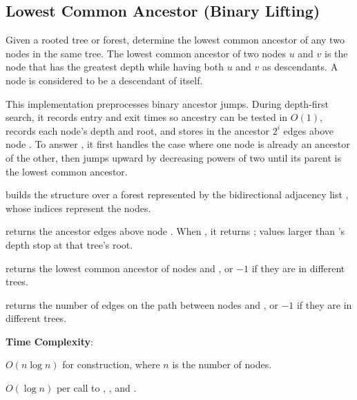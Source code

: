 \subsection{Lowest Common Ancestor (Binary Lifting)}
\label{sec:2.8.4}
Given a rooted tree or forest, determine the lowest common ancestor of any two nodes in the same tree. The lowest common ancestor of two nodes $u$ and $v$ is the node that has the greatest depth while having both $u$ and $v$ as descendants. A node is considered to be a descendant of itself.

This implementation preprocesses binary ancestor jumps. During depth-first search, it records entry and exit times so ancestry can be tested in $O(1)$, records each node's depth and root, and stores in  the ancestor $2^i$ edges above node . To answer , it first handles the case where one node is already an ancestor of the other, then jumps  upward by decreasing powers of two until its parent is the lowest common ancestor.

\begin{compactitem}
  \item {} builds the structure over a forest represented by the bidirectional adjacency list , whose indices represent the nodes.
  \item {} returns the ancestor  edges above node . When , it returns ; values larger than 's depth stop at that tree's root.
  \item {} returns the lowest common ancestor of nodes  and , or $-1$ if they are in different trees.
  \item {} returns the number of edges on the path between nodes  and , or $-1$ if they are in different trees.
\end{compactitem}

\textbf{Time Complexity}:
\begin{compactitem}
  \item $O(n \log n)$ for construction, where $n$ is the number of nodes.
  \item $O(\log n)$ per call to , , and .
\end{compactitem}

